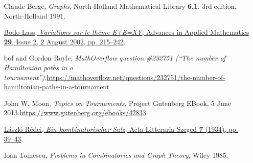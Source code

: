 \documentclass[numbers=enddot,12pt,final,onecolumn,notitlepage]{scrartcl}%
\numberwithin{exer}{subsection}
\theoremstyle{definition}
\begin{document}
\begin{thebibliography}{99999999}                                                                                         %


Claude Berge, \textit{Graphs}, North-Holland
Mathematical Library \textbf{6.1}, 3rd edition, North-Holland 1991.

%
\href{https://doi.org/10.1016/S0196-8858(02)00010-6}{Bodo Lass,
\textit{Variations sur le th\`{e}me E+E=XY}, Advances in Applied Mathematics
\textbf{29}, Issue 2, 2 August 2002, pp. 215--242}.

bof and Gordon Royle, \textit{MathOverflow
question \#232751 (\textquotedblleft The number of Hamiltonian paths in a
tournament\textquotedblright)}.\newline\url{https://mathoverflow.net/questions/232751/the-number-of-hamiltonian-paths-in-a-tournament}

John W. Moon, \textit{Topics on Tournaments}, Project
Gutenberg EBook, 5 June 2013.\newline\url{https://www.gutenberg.org/ebooks/42833}

%
\href{http://acta.bibl.u-szeged.hu/13432/}{L\'{a}szl\'{o} R\'{e}dei,
\textit{Ein kombinatorischer Satz}, Acta Litteraria Szeged \textbf{7} (1934),
pp. 39--43}.

Ioan Tomescu, \textit{Problems in Combinatorics
and Graph Theory}, Wiley 1985.
\end{thebibliography}
\end{document}
